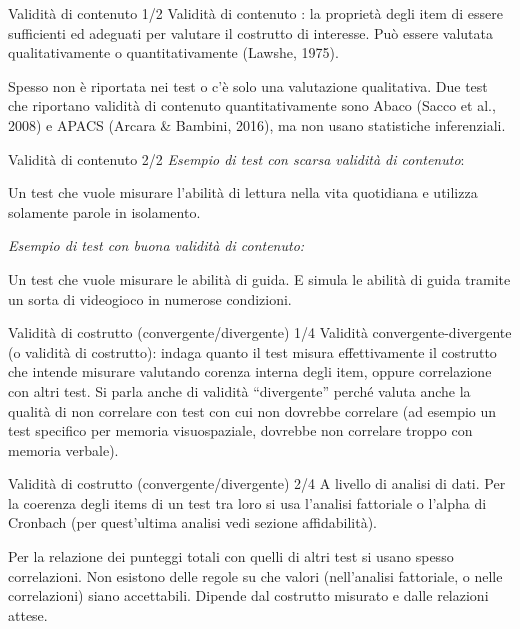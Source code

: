 \documentclass[
  ignorenonframetext,
]{beamer}
\begin{document}
\begin{frame}{Validità di contenuto 1/2}
\label{validituxe0-di-contenuto-12}
Validità di contenuto : la proprietà degli item di essere sufficienti ed
adeguati per valutare il costrutto di interesse. Può essere valutata
qualitativamente o quantitativamente (Lawshe, 1975).

\vfill

Spesso non è riportata nei test o c'è solo una valutazione qualitativa.
Due test che riportano validità di contenuto quantitativamente sono
Abaco (Sacco et al., 2008) e APACS (Arcara \& Bambini, 2016), ma non
usano statistiche inferenziali.
\end{frame}

\begin{frame}{Validità di contenuto 2/2}
\label{validituxe0-di-contenuto-22}
\emph{Esempio di test con scarsa validità di contenuto}:

Un test che vuole misurare l'abilità di lettura nella vita quotidiana e
utilizza solamente parole in isolamento.

\vfill

\emph{Esempio di test con buona validità di contenuto:}

Un test che vuole misurare le abilità di guida. E simula le abilità di
guida tramite un sorta di videogioco in numerose condizioni.
\end{frame}

\begin{frame}{Validità di costrutto (convergente/divergente) 1/4}
\label{validituxe0-di-costrutto-convergentedivergente-14}
Validità convergente-divergente (o validità di costrutto): indaga quanto
il test misura effettivamente il costrutto che intende misurare
valutando corenza interna degli item, oppure correlazione con altri
test. Si parla anche di validità ``divergente'' perché valuta anche la
qualità di non correlare con test con cui non dovrebbe correlare (ad
esempio un test specifico per memoria visuospaziale, dovrebbe non
correlare troppo con memoria verbale).
\end{frame}

\begin{frame}{Validità di costrutto (convergente/divergente) 2/4}
\label{validituxe0-di-costrutto-convergentedivergente-24}
A livello di analisi di dati. Per la coerenza degli items di un test tra
loro si usa l'analisi fattoriale o l'alpha di Cronbach (per quest'ultima
analisi vedi sezione affidabilità).

\vfill

Per la relazione dei punteggi totali con quelli di altri test si usano
spesso correlazioni. Non esistono delle regole su che valori
(nell'analisi fattoriale, o nelle correlazioni) siano accettabili.
Dipende dal costrutto misurato e dalle relazioni attese.
\end{frame}
\end{document}
